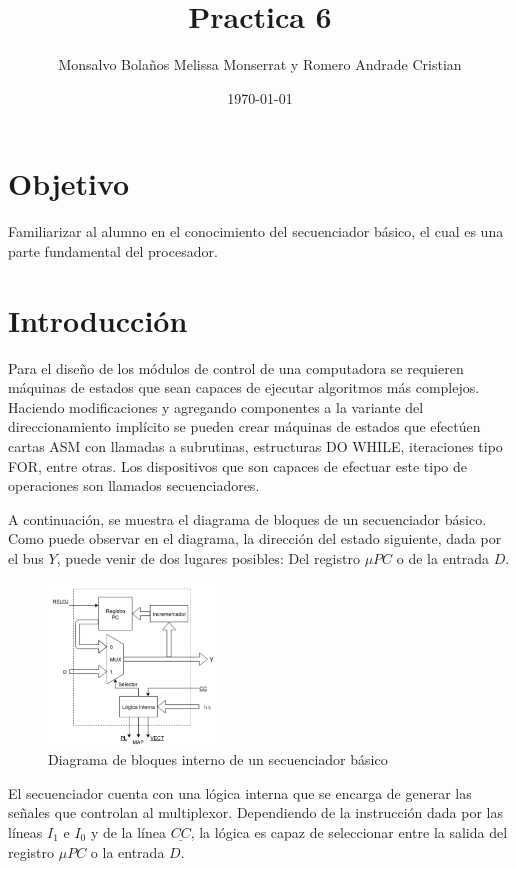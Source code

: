 \documentclass[table]{scrartcl}
\author{Monsalvo Bolaños Melissa Monserrat y Romero Andrade Cristian}
\date{\today}
\title{Practica 6}
\begin{document}

\date{}
\tableofcontents{}

\section{Objetivo}
\label{sec:objetivo}
Familiarizar al alumno en el conocimiento del secuenciador básico, el cual es
una parte fundamental del procesador.

\section{Introducción}\label{sec:introduccion}
Para el diseño de los módulos de control de una computadora se requieren máquinas de
estados que sean capaces de ejecutar algoritmos más complejos. Haciendo modificaciones
y agregando componentes a la variante del direccionamiento implícito se pueden crear
máquinas de estados que efectúen cartas ASM con llamadas a subrutinas, estructuras DO
WHILE, iteraciones tipo FOR, entre otras. Los dispositivos que son capaces de efectuar este
tipo de operaciones son llamados secuenciadores.

A continuación, se muestra el diagrama de bloques de un secuenciador básico. Como puede
observar en el diagrama, la dirección del estado siguiente, dada por el bus $Y$, puede venir de
dos lugares posibles: Del registro $\mu{}PC$ o de la entrada $D$.
\begin{figure}[H]
  \centering
  \includegraphics[width=0.4\textwidth]{./img/1}
  \caption[sec. basico]{Diagrama de bloques interno de un secuenciador básico}\label{fig:1}
\end{figure}

El secuenciador cuenta con una lógica interna que se encarga de generar las señales que
controlan al multiplexor. Dependiendo de la instrucción dada por las líneas $I_1$ e $I_0$ y de la línea
$\underline{CC}$, la lógica es capaz de seleccionar entre la salida del registro $\mu{}PC$ o la
entrada $D$.
\end{document}

